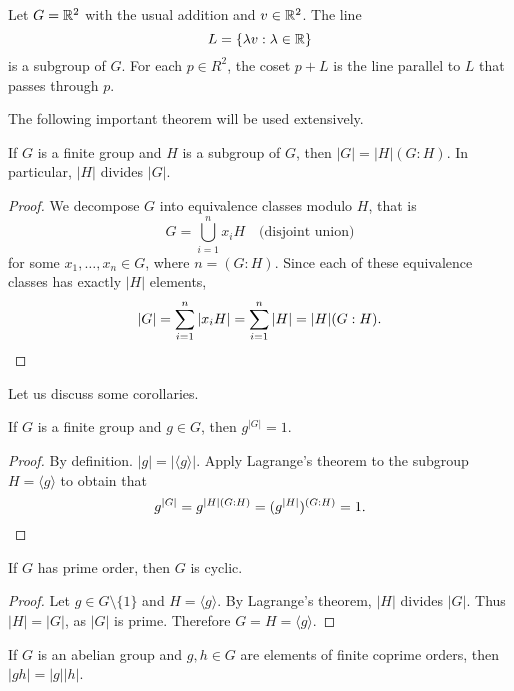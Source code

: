     \begin{example}
        Let $G=\mathbb{R}^2$ with the usual addition 
        and $v\in\mathbb{R}^2$. The line 
        \[
        L=\{\lambda v:\lambda\in\mathbb{R}\}
        \]
        is a subgroup of $G$. For each 
        $p\in R^2$, the coset $p+L$ 
        is the line parallel to $L$ that 
        passes through $p$.
    \end{example}

The following important theorem will be used extensively. 

\begin{theorem}[Lagrange]
    If $G$ is a finite group and $H$ is a subgroup of $G$, 
    then $|G|=|H|(G:H)$. In particular, $|H|$ divides $|G|$.
\end{theorem}

\begin{proof}
    We decompose $G$ into equivalence classes modulo $H$, that is 
    \[
    G=\bigcup_{i=1}^n x_iH\quad\text{(disjoint union)}
    \]
    for some $x_1,\dots,x_n\in G$, where $n=(G:H)$. 
    Since each of these equivalence classes has 
    exactly 
    $|H|$ elements,
    \[
            |G|=\sum_{i=1}^n|x_iH|=\sum_{i=1}^n|H|=|H|(G:H).\qedhere
    \]
\end{proof}

Let us discuss some corollaries. 

\begin{corollary}
    If $G$ is a finite group and $g\in G$, then $g^{|G|}=1$.
\end{corollary}

\begin{proof}
    By definition. $|g|=|\langle g\rangle|$. Apply Lagrange's theorem 
    to the subgroup $H=\langle g\rangle$ to obtain that 
    \[
            g^{|G|}=g^{|H|(G:H)}=(g^{|H|})^{(G:H)}=1.\qedhere
    \]
\end{proof}

\begin{corollary}
    If $G$ has prime order, then $G$ is cyclic. 
\end{corollary}

\begin{proof}
    Let $g\in G\setminus\{1\}$ and $H=\langle g\rangle$. By Lagrange's theorem, 
    $|H|$ divides $|G|$. Thus $|H|=|G|$, as $|G|$ is prime. Therefore 
    $G=H=\langle g\rangle$.
\end{proof}

\begin{corollary}
\label{cor:coprime_orders}
    If $G$ is an abelian group and $g,h\in G$ are elements of finite coprime orders, 
    then 
    $|gh|=|g||h|$.
\end{corollary}

